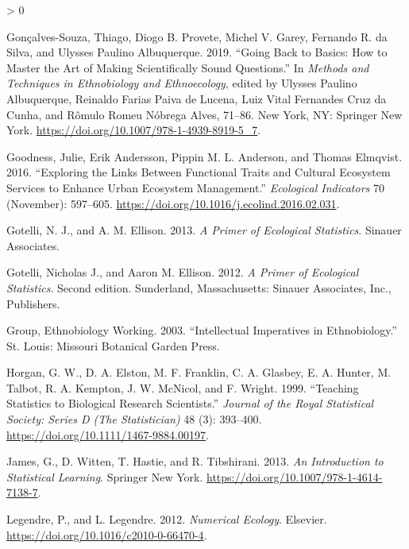 \documentclass[
]{article}
\newlength{\cslhangindent}
\newenvironment{CSLReferences}[2] %
 {%
  \setlength{\parindent}{0pt}
  \ifodd #1 \everypar{\setlength{\hangindent}{\cslhangindent}}\ignorespaces\fi
  \ifnum #2 > 0
  \setlength{\parskip}{#2\baselineskip}
  \fi
 }%
 {}
\begin{document}
\begin{CSLReferences}{1}{0}
\leavevmode\hypertarget{ref-albuquerque_going_2019}{}%
Gonçalves-Souza, Thiago, Diogo B. Provete, Michel V. Garey, Fernando R. da Silva, and Ulysses Paulino Albuquerque. 2019. {``Going {Back} to {Basics}: {How} to {Master} the {Art} of {Making} {Scientifically} {Sound} {Questions}.''} In \emph{Methods and {Techniques} in {Ethnobiology} and {Ethnoecology}}, edited by Ulysses Paulino Albuquerque, Reinaldo Farias Paiva de Lucena, Luiz Vital Fernandes Cruz da Cunha, and Rômulo Romeu Nóbrega Alves, 71--86. New York, NY: Springer New York. \url{https://doi.org/10.1007/978-1-4939-8919-5_7}.

\leavevmode\hypertarget{ref-goodness_exploring_2016}{}%
Goodness, Julie, Erik Andersson, Pippin M. L. Anderson, and Thomas Elmqvist. 2016. {``Exploring the Links Between Functional Traits and Cultural Ecosystem Services to Enhance Urban Ecosystem Management.''} \emph{Ecological Indicators} 70 (November): 597--605. \url{https://doi.org/10.1016/j.ecolind.2016.02.031}.

\leavevmode\hypertarget{ref-gotelli_primer_2013}{}%
Gotelli, N. J., and A. M. Ellison. 2013. \emph{A Primer of Ecological Statistics}. Sinauer Associates.

\leavevmode\hypertarget{ref-gotelli_primer_2012}{}%
Gotelli, Nicholas J., and Aaron M. Ellison. 2012. \emph{A Primer of Ecological Statistics}. Second edition. Sunderland, Massachusetts: Sinauer Associates, Inc., Publishers.

\leavevmode\hypertarget{ref-ethnobiology_working_group_intellectual_2003}{}%
Group, Ethnobiology Working. 2003. {``Intellectual Imperatives in Ethnobiology.''} St. Louis: Missouri Botanical Garden Press.

\leavevmode\hypertarget{ref-horgan_teaching_1999}{}%
Horgan, G. W., D. A. Elston, M. F. Franklin, C. A. Glasbey, E. A. Hunter, M. Talbot, R. A. Kempton, J. W. McNicol, and F. Wright. 1999. {``Teaching {Statistics} to {Biological} {Research} {Scientists}.''} \emph{Journal of the Royal Statistical Society: Series D (The Statistician)} 48 (3): 393--400. \url{https://doi.org/10.1111/1467-9884.00197}.

\leavevmode\hypertarget{ref-james_introduction_2013}{}%
James, G., D. Witten, T. Hastie, and R. Tibshirani. 2013. \emph{An {Introduction} to {Statistical} {Learning}}. Springer New York. \url{https://doi.org/10.1007/978-1-4614-7138-7}.

\leavevmode\hypertarget{ref-legendre_numerical_2012}{}%
Legendre, P., and L. Legendre. 2012. \emph{Numerical {Ecology}}. Elsevier. \url{https://doi.org/10.1016/c2010-0-66470-4}.


\end{CSLReferences}
\end{document}
